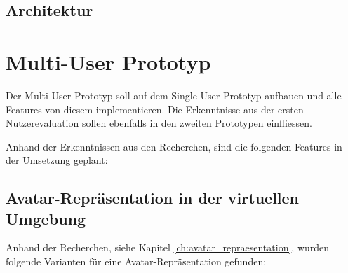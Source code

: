 \subsection{Architektur}

\pagebreak
\section{Multi-User Prototyp}
Der Multi-User Prototyp soll auf dem Single-User Prototyp aufbauen und alle Features von diesem implementieren. Die Erkenntnisse aus der ersten Nutzerevaluation sollen ebenfalls in den zweiten Prototypen einfliessen.

Anhand der Erkenntnissen aus den Recherchen, sind die folgenden Features in der Umsetzung geplant:

\subsection{Avatar-Repräsentation in der virtuellen Umgebung}
\label{ch:avatar_repraesentation_realisierung}
Anhand der Recherchen, siehe Kapitel \ref{ch:avatar_repraesentation}, wurden folgende Varianten für eine Avatar-Repräsentation gefunden:
